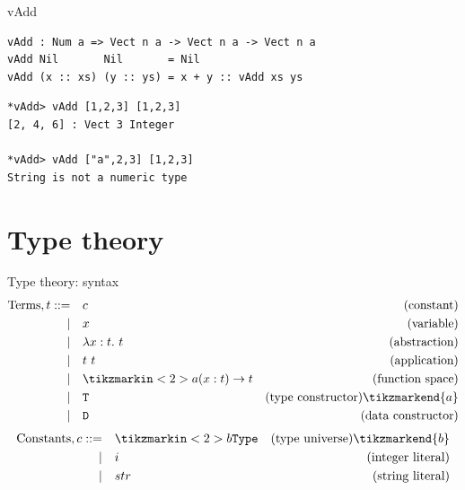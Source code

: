\documentclass{beamer}
\begin{document}
\begin{frame}[fragile]{\dependentTypes}
	\begin{block}{vAdd}
		\begin{lstlisting}[basicstyle=\ttfamily\scriptsize]
vAdd : Num a => Vect n a -> Vect n a -> Vect n a
vAdd Nil       Nil       = Nil
vAdd (x :: xs) (y :: ys) = x + y :: vAdd xs ys
		\end{lstlisting}
	\end{block}
\begin{block}{}
	\begin{lstlisting}[basicstyle=\ttfamily\scriptsize]
*vAdd> vAdd [1,2,3] [1,2,3]
[2, 4, 6] : Vect 3 Integer

*vAdd> vAdd ["a",2,3] [1,2,3]
String is not a numeric type
	\end{lstlisting}
\end{block}
\end{frame}

\newcommand{\typetheory}{Type theory}
\section{\typetheory}
\label{sec:typetheory}

\begin{frame}{\typetheory: syntax}
    \begin{align*}
        \text{Terms}, t ::= \quad & c & \text{(constant)} \\
          | \quad & x & \text{(variable)} \\
          | \quad & \lambda x : t.\ t & \text{(abstraction)} \\
          | \quad & t\ t & \text{(application)} \\
          | \quad & \tikzmarkin<2>{a} {(}x : t) \to t & \text{(function space)}  \\
          | \quad & \texttt{T} & \text{(type constructor)} \tikzmarkend{a} \\
          | \quad & \texttt{D} & \text{(data constructor)} \\
    \end{align*}
    \begin{align*}
        \text{Constants}, c ::= \quad & \tikzmarkin<2>{b} \texttt{Type} & \text{(type universe)} \tikzmarkend{b} \\
          | \quad & i & \text{(integer literal)} \\
          | \quad & str & \text{(string literal)} \\
    \end{align*}
\end{frame}
\end{document}
